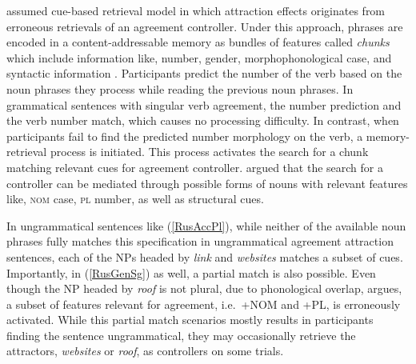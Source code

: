 \documentclass[
  authoryear,
  3p]{elsarticle}
\begin{document}
\citet{Slioussar2018} assumed cue-based retrieval model in which
attraction effects originates from erroneous retrievals of an agreement
controller. Under this approach, phrases are encoded in a
content-addressable memory as bundles of features called \emph{chunks}
which include information like, number, gender, morphophonological case,
and syntactic information \citep{SmithVasishth2020, LV05}. Participants
predict the number of the verb based on the noun phrases they process
while reading the previous noun phrases. In grammatical sentences with
singular verb agreement, the number prediction and the verb number
match, which causes no processing difficulty. In contrast, when
participants fail to find the predicted number morphology on the verb, a
memory-retrieval process is initiated. This process activates the search
for a chunk matching relevant cues for agreement controller.
\citet{Slioussar2018} argued that the search for a controller can be
mediated through possible forms of nouns with relevant features like,
\textsc{nom} case, \textsc{pl} number, as well as structural cues.

In ungrammatical sentences like (\ref{RusAccPl}), while neither of the
available noun phrases fully matches this specification in ungrammatical
agreement attraction sentences, each of the NPs headed by \emph{link}
and \emph{websites} matches a subset of cues. Importantly, in
(\ref{RusGenSg}) as well, a partial match is also possible. Even though
the NP headed by \emph{roof} is not plural, due to phonological overlap,
\citet{Slioussar2018} argues, a subset of features relevant for
agreement, i.e.~+NOM and +PL, is erroneously activated. While this
partial match scenarios mostly results in participants finding the
sentence ungrammatical, they may occasionally retrieve the attractors,
\emph{websites} or \emph{roof}, as controllers on some trials.
\end{document}
